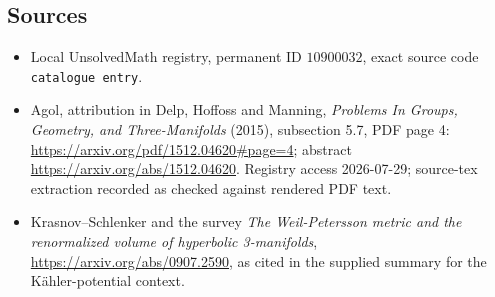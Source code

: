\documentclass[11pt]{article}
\begin{document}
\subsection{Sources}
\begin{itemize}
\item Local UnsolvedMath registry, permanent ID \(10900032\), exact source code \texttt{catalogue entry}.
\item Agol, attribution in Delp, Hoffoss and Manning, \emph{Problems In Groups, Geometry, and Three-Manifolds} (2015), subsection 5.7, PDF page 4: \url{https://arxiv.org/pdf/1512.04620#page=4}; abstract \url{https://arxiv.org/abs/1512.04620}. Registry access 2026-07-29; source-tex extraction recorded as checked against rendered PDF text.
\item Krasnov--Schlenker and the survey \emph{The Weil-Petersson metric and the renormalized volume of hyperbolic 3-manifolds}, \url{https://arxiv.org/abs/0907.2590}, as cited in the supplied summary for the K\"ahler-potential context.
\end{itemize}
\end{document}
